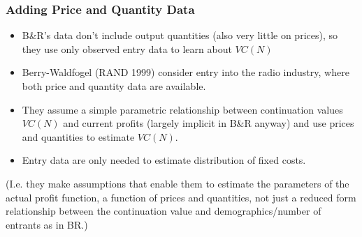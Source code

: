 \begin{frame}%

\frametitle{Adding Price and Quantity Data}

\begin{itemize}
\item B\&R's data don't include output quantities (also very little on
prices), so they use only observed entry data to learn about $VC(N)$

\item Berry-Waldfogel (RAND 1999) consider entry into the radio industry,
where both price and quantity data are available.

\item They assume a simple parametric relationship between continuation
values $VC(N)$ and current profits (largely implicit in B\&R anyway) and use
prices and quantities to estimate $VC(N)$.

\item Entry data are only needed to estimate distribution of fixed costs.
\end{itemize}

(I.e. they make assumptions that enable them to estimate the parameters of
the actual profit function, a function of prices and quantities, not just a
reduced form relationship between the continuation value and
demographics/number of entrants as in BR.)

\end{frame}%

